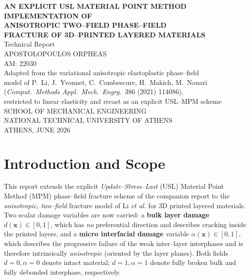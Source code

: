 \documentclass[12pt,a4paper]{article}
\newcommand{\eng}[1]{#1}
\newcommand{\bx}{\mathbf{x}}
\begin{document}
	\setlength{\parindent}{0pt}

	\begin{titlepage}
		\centering
		{\LARGE\bfseries AN EXPLICIT USL MATERIAL POINT METHOD \\[.3cm]
		IMPLEMENTATION OF \\[.5cm] ANISOTROPIC TWO--FIELD PHASE--FIELD \\[.3cm]
		FRACTURE OF 3D--PRINTED LAYERED MATERIALS}\\[2.5cm]

		{\large Technical Report}\\[1cm]

		{\large APOSTOLOPOULOS ORPHEAS}\\[0.5cm]
		{\large AM: 22030}\\[2.5cm]

		{\large Adapted from the variational anisotropic elastoplastic phase--field\\
		model of P.~Li, J.~Yvonnet, C.~Combescure, H.~Makich, M.~Nouari\\
		(\emph{Comput.\ Methods Appl.\ Mech.\ Engrg.}~386 (2021) 114086),\\
		restricted to linear elasticity and recast as an explicit USL--MPM scheme}\\[2.5cm]

		{\large SCHOOL OF MECHANICAL ENGINEERING}\\
		{\large NATIONAL TECHNICAL UNIVERSITY OF ATHENS}\\[3cm]

		{\large ATHENS, JUNE 2026}
	\end{titlepage}

	\tableofcontents
	\newpage

	\section{Introduction and Scope}\label{sec:intro}

	This report extends the explicit \emph{Update--Stress--Last} (\eng{USL})
	Material Point Method (\eng{MPM}) phase--field fracture scheme of the companion
	report to the \emph{anisotropic, two--field} fracture model of Li \emph{et al.}
	for 3D printed layered materials. Two scalar damage variables are now carried:
	a \textbf{bulk layer damage} $d(\bx)\in[0,1]$, which has \emph{no} preferential
	direction and describes cracking inside the printed layers, and a \textbf{micro
	interfacial damage} variable $\alpha(\bx)\in[0,1]$, which describes the
	progressive failure of the weak inter--layer interphases and is therefore
	intrinsically \emph{anisotropic} (oriented by the layer planes). Both fields
	$d=0,\alpha=0$ denote intact material; $d=1,\alpha=1$ denote fully broken bulk
	and fully debonded interphase, respectively.
\end{document}
